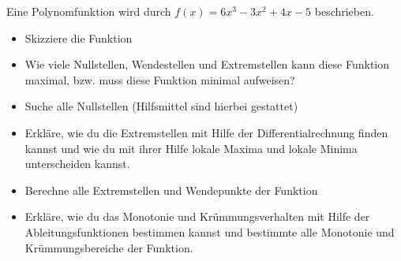 
Eine Polynomfunktion wird durch $f(x) = 6x^3 - 3x^2 + 4x - 5$ beschrieben.

\begin{itemize}
	\item Skizziere die Funktion
	\item Wie viele Nullstellen, Wendestellen und Extremstellen kann diese Funktion maximal,
		bzw. muss diese Funktion minimal aufweisen?
	\item Suche alle Nullstellen (Hilfsmittel sind hierbei gestattet)
	\item Erkläre, wie du die Extremstellen mit Hilfe der Differentialrechnung finden kannst
		und wie du mit ihrer Hilfe lokale Maxima und lokale Minima unterscheiden kannst.
	\item Berechne alle Extremstellen und Wendepunkte der Funktion
	\item Erkläre, wie du das Monotonie und Krümmungsverhalten mit Hilfe der Ableitungsfunktionen
		bestimmen kannst und bestimmte alle Monotonie und Krümmungsbereiche der Funktion.
\end{itemize}